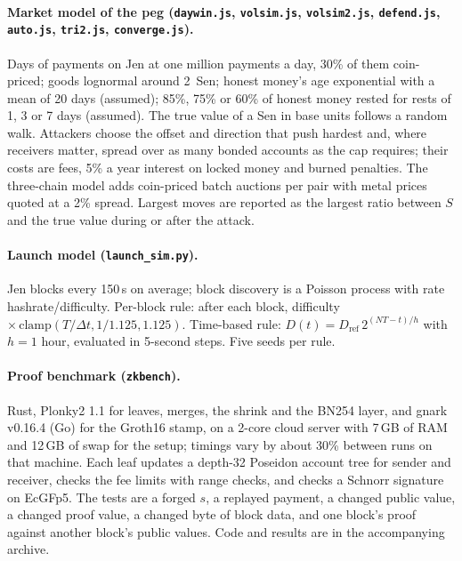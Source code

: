 \paragraph{Market model of the peg (\texttt{daywin.js}, \texttt{volsim.js}, \texttt{volsim2.js}, \texttt{defend.js}, \texttt{auto.js}, \texttt{tri2.js}, \texttt{converge.js}).} Days of payments on Jen at one million payments a day, 30\% of them coin-priced; goods lognormal around 2~Sen; honest money's age exponential with a mean of 20 days (assumed); 85\%, 75\% or 60\% of honest money rested for rests of 1, 3 or 7 days (assumed). The true value of a Sen in base units follows a random walk. Attackers choose the offset and direction that push hardest and, where receivers matter, spread over as many bonded accounts as the cap requires; their costs are fees, 5\% a year interest on locked money and burned penalties. The three-chain model adds coin-priced batch auctions per pair with metal prices quoted at a 2\% spread. Largest moves are reported as the largest ratio between $S$ and the true value during or after the attack.

\paragraph{Launch model (\texttt{launch\_sim.py}).} Jen blocks every 150\,s on average; block discovery is a Poisson process with rate hashrate/difficulty. Per-block rule: after each block, difficulty $\times\,\mathrm{clamp}(T/\Delta t, 1/1.125, 1.125)$. Time-based rule: $D(t) = D_{\mathrm{ref}}\,2^{(NT-t)/h}$ with $h=1$ hour, evaluated in 5-second steps. Five seeds per rule.

\paragraph{Proof benchmark (\texttt{zkbench}).} Rust, Plonky2 1.1 for leaves, merges, the shrink and the BN254 layer, and gnark v0.16.4 (Go) for the Groth16 stamp, on a 2-core cloud server with 7\,GB of RAM and 12\,GB of swap for the setup; timings vary by about 30\% between runs on that machine. Each leaf updates a depth-32 Poseidon account tree for sender and receiver, checks the fee limits with range checks, and checks a Schnorr signature on EcGFp5. The tests are a forged $s$, a replayed payment, a changed public value, a changed proof value, a changed byte of block data, and one block's proof against another block's public values. Code and results are in the accompanying archive.

